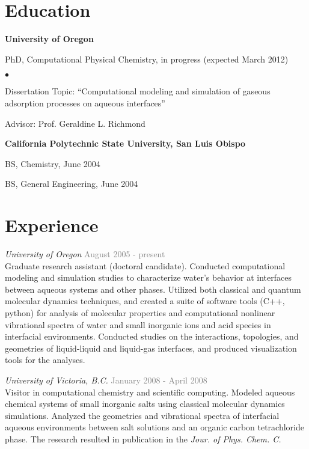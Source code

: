 \documentclass[margin,line]{res}
\newenvironment{list1}{
  \begin{list}{\ding{113}}{%
      \setlength{\itemsep}{0in}
      \setlength{\parsep}{0in} \setlength{\parskip}{0in}
      \setlength{\topsep}{0in} \setlength{\partopsep}{0in} 
      \setlength{\leftmargin}{0.17in}}}{\end{list}}
\newenvironment{list2}{
  \begin{list}{$\bullet$}{%
      \setlength{\itemsep}{0in}
      \setlength{\parsep}{0in} \setlength{\parskip}{0in}
      \setlength{\topsep}{0in} \setlength{\partopsep}{0in} 
      \setlength{\leftmargin}{0.2in}}}{\end{list}}
\begin{document}
\begin{resume}
\section{\sc Education}
{\bf University of Oregon}\\
\vspace*{-.1in}
\begin{list1}
\item[] {\sc PhD}, Computational Physical Chemistry, in progress (expected March 2012) 
\begin{list2}
\item[] Dissertation Topic:  ``Computational modeling and simulation of gaseous adsorption processes on aqueous interfaces''
\item[] Advisor: Prof. Geraldine L. Richmond
\end{list2}
\end{list1}

{\bf California Polytechnic State University, San Luis Obispo}\\
\vspace*{-.1in}
\begin{list1}
\item[] {\sc BS}, Chemistry, June 2004
\item[] {\sc BS}, General Engineering, June 2004
\end{list1}

\section{\sc Experience}

\emph{University of Oregon} \hfill { \textcolor{gray}{August 2005 - present} }\\
Graduate research assistant (doctoral candidate).  Conducted computational modeling and simulation studies to characterize water's behavior at interfaces between aqueous systems and other phases. Utilized both classical and quantum molecular dynamics techniques, and created a suite of software tools (C++, python) for analysis of molecular properties and computational nonlinear vibrational spectra of water and small inorganic ions and acid species in interfacial environments. Conducted studies on the interactions, topologies, and geometries of liquid-liquid and liquid-gas interfaces, and produced visualization tools for the analyses.

\emph{University of Victoria, B.C.} \hfill {\textcolor{gray}{January 2008 - April 2008}}\\
Visitor in computational chemistry and scientific computing.  Modeled aqueous chemical systems of small inorganic salts using classical molecular dynamics simulations. Analyzed the geometries and vibrational spectra of interfacial aqueous environments between salt solutions and an organic carbon tetrachloride phase. The research resulted in publication in the \textit{Jour. of Phys. Chem. C.}


\end{resume}
\end{document}
